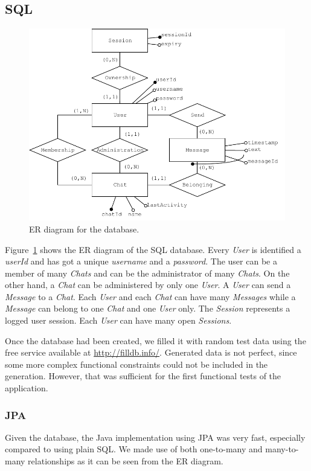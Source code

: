 \documentclass[10pt]{article}
\begin{document}
\subsection{SQL}
\begin{figure}[]
    \centering
    \includegraphics[width=\textwidth]{figs/ER}
    \caption{ER diagram for the database.}
    \label{fig:er}
\end{figure}

Figure~\ref{fig:er} shows the ER diagram of the SQL database. Every \emph{User} 
is identified a \emph{userId} and has got a unique \emph{username} and a 
\emph{password}. The user can be a member of many \emph{Chats} and can 
be the administrator of many \emph{Chats}. On the other hand, a \emph{Chat} 
can be administered by only one \emph{User}. A \emph{User} can send a 
\emph{Message} to a \emph{Chat}. Each \emph{User} and each \emph{Chat} can 
have many \emph{Messages} while a \emph{Message} can belong to one \emph{Chat}
and one \emph{User} only. The \emph{Session} represents a logged user session.
Each \emph{User} can have many open \emph{Sessions}.

Once the database had been created, we filled it with random test data using the free
service available at \url{http://filldb.info/}. Generated data is not perfect, 
since some more complex functional constraints could not be included in the 
generation. However, that was sufficient for the first functional tests of the
application.

\subsubsection{JPA}
Given the database, the Java implementation using JPA was very fast, especially
compared to using plain SQL. We made use of both one-to-many and many-to-many 
relationships as it can be seen from the ER diagram.
\end{document}
